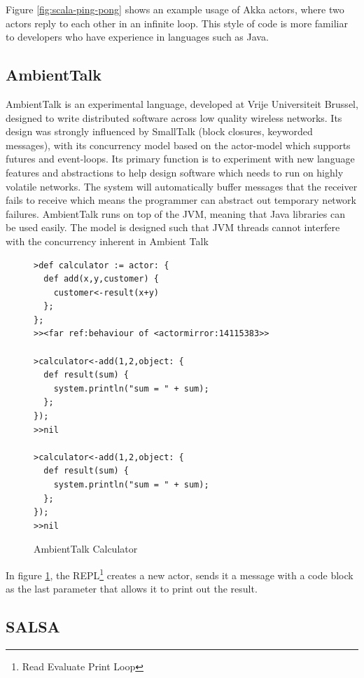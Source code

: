 \documentclass[11pt,a4paper]{report}
\begin{document}
Figure \ref{fig:scala-ping-pong} shows an example usage of Akka actors, where two actors reply to each other in an infinite loop.
This style of code is more familiar to developers who have experience in languages such as Java.

\subsection{AmbientTalk}
\label{sec:ambienttalk}

AmbientTalk\cite{ambienttalk-failure} is an experimental language, developed at Vrije Universiteit Brussel, designed to write distributed software across low quality wireless networks.
Its design was strongly influenced by SmallTalk (block closures, keyworded messages), with its concurrency model based on the actor-model which supports futures and event-loops.
Its primary function is to experiment with new language features and abstractions to help design software which needs to run on highly volatile networks.
The system will automatically buffer messages that the receiver fails to receive which means the programmer can abstract out temporary network failures.
AmbientTalk runs on top of the JVM, meaning that Java libraries can be used easily.
The model is designed such that JVM threads cannot interfere with the concurrency inherent in Ambient Talk\cite{ambienttalk-interfere}

\begin{figure}[H]
\begin{verbatim}
>def calculator := actor: {
  def add(x,y,customer) {
    customer<-result(x+y)
  };
};
>><far ref:behaviour of <actormirror:14115383>>

>calculator<-add(1,2,object: {
  def result(sum) {
    system.println("sum = " + sum);
  };
});
>>nil

>calculator<-add(1,2,object: {
  def result(sum) {
    system.println("sum = " + sum);
  };
});
>>nil
\end{verbatim}
\caption{AmbientTalk Calculator\cite{ambienttalk-example}}
\label{fig:ambienttalk-calc}
\end{figure}

In figure \ref{fig:ambienttalk-calc}, the REPL\footnote{Read Evaluate Print Loop} creates a new actor, sends it a message with a code block as the last parameter that allows it to print out the result.

\subsection{SALSA}
\end{document}
